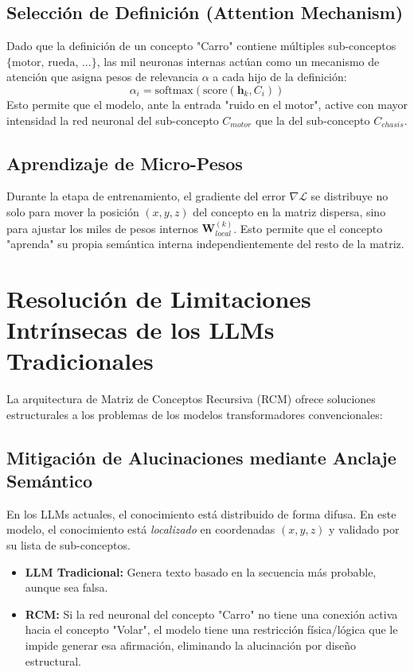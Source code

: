 \documentclass[12pt]{article}
\begin{document}
\subsection{Selección de Definición (Attention Mechanism)}
Dado que la definición de un concepto "Carro" contiene múltiples sub-conceptos $\{\text{motor, rueda, ...}\}$, las mil neuronas internas actúan como un mecanismo de atención que asigna pesos de relevancia $\alpha$ a cada hijo de la definición:
$$ \alpha_i = \text{softmax}( \text{score}(\mathbf{h}_k, C_i) ) $$
Esto permite que el modelo, ante la entrada "ruido en el motor", active con mayor intensidad la red neuronal del sub-concepto $C_{motor}$ que la del sub-concepto $C_{chasis}$.

\subsection{Aprendizaje de Micro-Pesos}
Durante la etapa de entrenamiento, el gradiente del error $\nabla \mathcal{L}$ se distribuye no solo para mover la posición $(x, y, z)$ del concepto en la matriz dispersa, sino para ajustar los miles de pesos internos $\mathbf{W}_{local}^{(k)}$. Esto permite que el concepto "aprenda" su propia semántica interna independientemente del resto de la matriz.


\section{Resolución de Limitaciones Intrínsecas de los LLMs Tradicionales}

La arquitectura de Matriz de Conceptos Recursiva (RCM) ofrece soluciones estructurales a los problemas de los modelos transformadores convencionales:

\subsection{Mitigación de Alucinaciones mediante Anclaje Semántico}
En los LLMs actuales, el conocimiento está distribuido de forma difusa. En este modelo, el conocimiento está \textit{localizado} en coordenadas $(x, y, z)$ y validado por su lista de sub-conceptos.
\begin{itemize}
    \item \textbf{LLM Tradicional:} Genera texto basado en la secuencia más probable, aunque sea falsa.
    \item \textbf{RCM:} Si la red neuronal del concepto "Carro" no tiene una conexión activa hacia el concepto "Volar", el modelo tiene una restricción física/lógica que le impide generar esa afirmación, eliminando la alucinación por diseño estructural.
\end{itemize}
\end{document}
